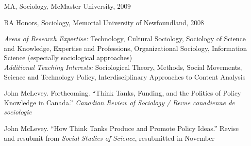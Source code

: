 \documentclass[11pt,usenames,dvipsnames]{article}
\begin{document}

\noindent MA, Sociology, McMaster University, 2009

\noindent BA Honors, Sociology, Memorial University of Newfoundland, 2008 \\



\noindent \emph{Areas of Research Expertise:} Technology, Cultural Sociology, Sociology of Science and Knowledge, Expertise and Professions, Organizational Sociology, Information Science (especially sociological approaches) \\

\noindent \emph{Additional Teaching Interests:} Sociological Theory, Methods, Social Movements, Science and Technology Policy, Interdisciplinary Approaches to Content Analysis \\




\ind John McLevey. Forthcoming. ``Think Tanks, Funding, and the Politics of Policy Knowledge in Canada.'' \emph{Canadian Review of Sociology / Revue canadienne de sociologie}\\



\ind John McLevey. ``How Think Tanks Produce and Promote Policy Ideas.'' Revise and resubmit from \emph{Social Studies of Science}, resubmitted in November \\
\end{document}
